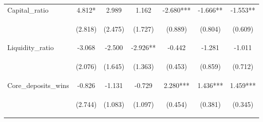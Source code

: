 \documentclass[]{article}
\begin{document}
\begin{center}
\begin{tabular}{lcccccc}
Capital\_ratio & 4.812* & 2.989 & 1.162 & -2.680*** & -1.666** & -1.553** \\
\vspace{4pt} & \begin{footnotesize}(2.818)\end{footnotesize} & \begin{footnotesize}(2.475)\end{footnotesize} & \begin{footnotesize}(1.727)\end{footnotesize} & \begin{footnotesize}(0.889)\end{footnotesize} & \begin{footnotesize}(0.804)\end{footnotesize} & \begin{footnotesize}(0.609)\end{footnotesize} \\
Liquidity\_ratio & -3.068 & -2.500 & -2.926** & -0.442 & -1.281 & -1.011 \\
\vspace{4pt} & \begin{footnotesize}(2.076)\end{footnotesize} & \begin{footnotesize}(1.645)\end{footnotesize} & \begin{footnotesize}(1.363)\end{footnotesize} & \begin{footnotesize}(0.453)\end{footnotesize} & \begin{footnotesize}(0.859)\end{footnotesize} & \begin{footnotesize}(0.712)\end{footnotesize} \\
Core\_deposits\_wins & -0.826 & -1.131 & -0.729 & 2.280*** & 1.436*** & 1.459*** \\
\vspace{4pt} & \begin{footnotesize}(2.744)\end{footnotesize} & \begin{footnotesize}(1.083)\end{footnotesize} & \begin{footnotesize}(1.097)\end{footnotesize} & \begin{footnotesize}(0.454)\end{footnotesize} & \begin{footnotesize}(0.381)\end{footnotesize} & \begin{footnotesize}(0.345)\end{footnotesize} \\

\end{tabular}
\end{center}
\end{document}
